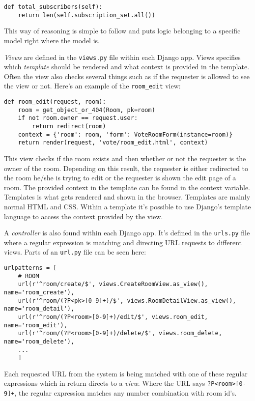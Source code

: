 \begin{lstlisting}[caption=The total subscribers method, label=lst:total-subscribers-method]
def total_subscribers(self):
    return len(self.subscription_set.all())
\end{lstlisting}
This way of reasoning is simple to follow and puts logic belonging to a specific model right where the model is.

\emph{Views} are defined in the \texttt{views.py} file within each Django app. Views specifies which \emph{template} should be rendered and what context is provided in the template. Often the view also checks several things such as if the requester is allowed to see the view or not. Here's an example of the \texttt{room\_edit} view:

\begin{lstlisting}[caption=The Room edit method, label=lst:room-edit-method]
def room_edit(request, room):
    room = get_object_or_404(Room, pk=room)
    if not room.owner == request.user:
        return redirect(room)
    context = {'room': room, 'form': VoteRoomForm(instance=room)}
    return render(request, 'vote/room_edit.html', context)
\end{lstlisting}
This view checks if the room exists and then whether or not the requester is the owner of the room. Depending on this result, the requester is either redirected to the room he/she is trying to edit or the requester is shown the edit page of a room. The provided context in the template can be found in the context variable. Templates is what gets rendered and shown in the browser. Templates are mainly normal HTML and CSS. Within a template it's possible to use Django's template language to access the context provided by the view. 

A \emph{controller} is also found within each Django app. It's defined in the \texttt{urls.py} file where a regular expression is matching and directing URL requests to different views. Parts of an \texttt{url.py} file can be seen here:


\begin{lstlisting}[caption=URL Patterns from the vote app, label=lst:urlpatterns]
urlpatterns = [
    # ROOM
    url(r'^room/create/$', views.CreateRoomView.as_view(), name='room_create'),
    url(r'^room/(?P<pk>[0-9]+)/$', views.RoomDetailView.as_view(), name='room_detail'),
    url(r'^room/(?P<room>[0-9]+)/edit/$', views.room_edit, name='room_edit'),
    url(r'^room/(?P<room>[0-9]+)/delete/$', views.room_delete, name='room_delete'),
    ...
    ]
\end{lstlisting}
Each requested URL from the system is being matched with one of these regular expressions which in return directs to a \emph{view}. Where the URL says \texttt{?P<room>[0-9]+}, the regular expression matches any number combination with room id's.

